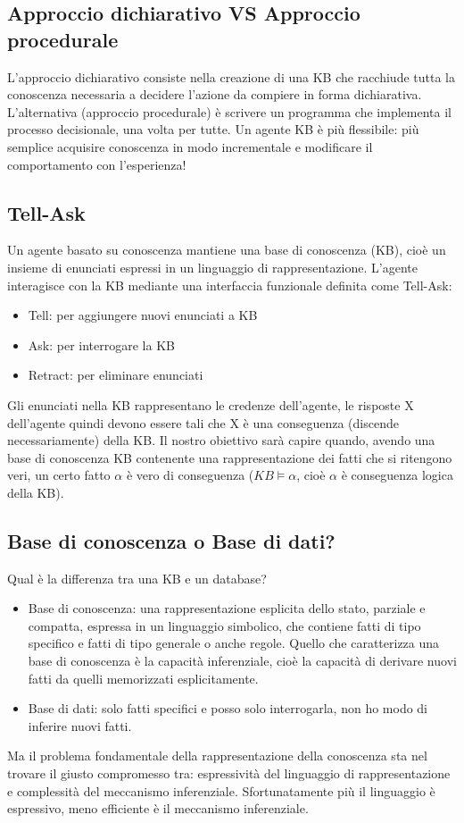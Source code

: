 \documentclass{article}
\begin{document}
\subsection{Approccio dichiarativo VS Approccio procedurale}
L'approccio dichiarativo consiste nella creazione di una KB che racchiude tutta la conoscenza necessaria a decidere l’azione da compiere in forma dichiarativa. L’alternativa (approccio procedurale) è scrivere un programma che implementa il processo decisionale, una volta per tutte. \newline
Un agente KB è più flessibile: più semplice acquisire conoscenza in modo incrementale e modificare il comportamento con l’esperienza!

\subsection{Tell-Ask} 
Un agente basato su conoscenza mantiene una base di conoscenza (KB), cioè un insieme di enunciati espressi in un linguaggio di rappresentazione. L'agente interagisce con la KB mediante una interfaccia funzionale definita come Tell-Ask:
\begin{itemize}
    \item Tell: per aggiungere nuovi enunciati a KB
    \item Ask: per interrogare la KB
    \item Retract: per eliminare enunciati
\end{itemize}
Gli enunciati nella KB rappresentano le credenze dell'agente, le risposte X dell'agente quindi devono essere tali che X è una conseguenza (discende necessariamente) della KB. \newline 
Il nostro obiettivo sarà capire quando, avendo una base di conoscenza KB contenente una rappresentazione dei fatti che si ritengono veri, un certo fatto $\alpha$ è vero di conseguenza ($KB \models \alpha$, cioè $\alpha$ è conseguenza logica della KB).

\subsection{Base di conoscenza o Base di dati?}
Qual è la differenza tra una KB e un database?
\begin{itemize}
    \item Base di conoscenza: una rappresentazione esplicita dello stato, parziale e compatta, espressa in un linguaggio simbolico, che contiene fatti di tipo specifico e fatti di tipo generale o anche regole. Quello che caratterizza una base di conoscenza è la capacità inferenziale, cioè la capacità di derivare nuovi fatti da quelli memorizzati esplicitamente. 
    \item Base di dati: solo fatti specifici e posso solo interrogarla, non ho modo di inferire nuovi fatti.
\end{itemize}
Ma il problema fondamentale della rappresentazione della conoscenza sta nel trovare il giusto compromesso tra: espressività del linguaggio di rappresentazione e complessità del meccanismo inferenziale. Sfortunatamente più il linguaggio è espressivo, meno  efficiente è il meccanismo inferenziale.
\end{document}

